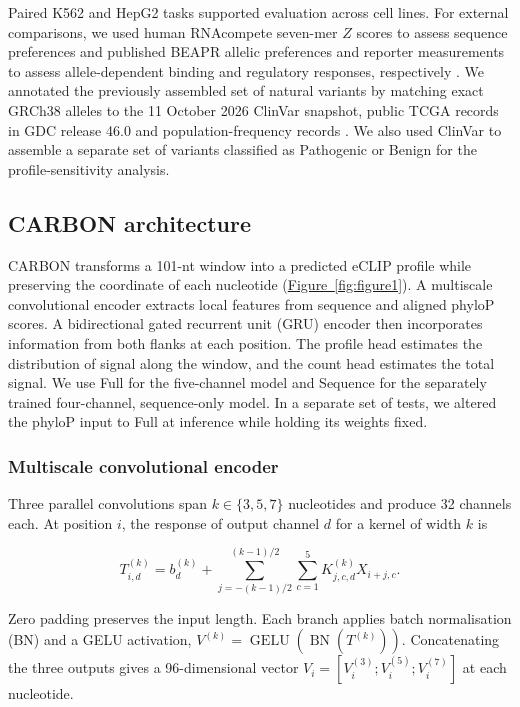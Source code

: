\documentclass[webpdf,contemporary,large]{current_assets/oup-authoring-template}
\newcommand{\figrefwhole}[1]{\hyperref[#1]{Figure~\ref*{#1}}}
\begin{document}
Paired K562 and HepG2 tasks supported evaluation across cell lines. For external comparisons, we used human RNAcompete seven-mer $Z$ scores to assess sequence preferences \citep{ray2013compendium} and published BEAPR allelic preferences and reporter measurements to assess allele-dependent binding and regulatory responses, respectively \citep{yang2019asb}. We annotated the previously assembled set of natural variants by matching exact GRCh38 alleles to the 11 October 2026 ClinVar snapshot, public TCGA records in GDC release 46.0 and population-frequency records \citep{landrum2018clinvar,grossman2016gdc}. We also used ClinVar to assemble a separate set of variants classified as Pathogenic or Benign for the profile-sensitivity analysis.

\subsection{CARBON architecture}\label{sec:algorithm}

CARBON transforms a 101-nt window into a predicted eCLIP profile while preserving the coordinate of each nucleotide (\figrefwhole{fig:figure1}). A multiscale convolutional encoder extracts local features from sequence and aligned phyloP scores. A bidirectional gated recurrent unit (GRU) encoder then incorporates information from both flanks at each position. The profile head estimates the distribution of signal along the window, and the count head estimates the total signal. We use Full for the five-channel model and Sequence for the separately trained four-channel, sequence-only model. In a separate set of tests, we altered the phyloP input to Full at inference while holding its weights fixed.

\subsubsection{Multiscale convolutional encoder}\label{subsec:blocks}

Three parallel convolutions span $k\in\{3,5,7\}$ nucleotides and produce 32 channels each. At position $i$, the response of output channel $d$ for a kernel of width $k$ is

\begin{equation}
T^{(k)}_{i,d}=b^{(k)}_d+
\sum_{j=-(k-1)/2}^{(k-1)/2}\sum_{c=1}^{5}
K^{(k)}_{j,c,d}X_{i+j,c}.
\label{eq:multiscale_convolution}
\end{equation}

Zero padding preserves the input length. Each branch applies batch normalisation (BN) and a GELU activation, $V^{(k)}=\operatorname{GELU}(\operatorname{BN}(T^{(k)}))$. Concatenating the three outputs gives a 96-dimensional vector $V_i=[V_i^{(3)};V_i^{(5)};V_i^{(7)}]$ at each nucleotide.
\end{document}
